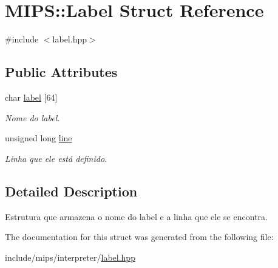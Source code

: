 \hypertarget{structMIPS_1_1Label}{}\section{M\+I\+PS\+:\+:Label Struct Reference}
\label{structMIPS_1_1Label}


{\ttfamily \#include $<$label.\+hpp$>$}

\subsection*{Public Attributes}
\begin{DoxyCompactItemize}
\item 
char \hyperlink{structMIPS_1_1Label_aeb046f4a05c4ab7c02a87b49bd75de51}{label} \mbox{[}64\mbox{]}\hypertarget{structMIPS_1_1Label_aeb046f4a05c4ab7c02a87b49bd75de51}{}\label{structMIPS_1_1Label_aeb046f4a05c4ab7c02a87b49bd75de51}

\begin{DoxyCompactList}\small\item\em Nome do label. \end{DoxyCompactList}\item 
unsigned long \hyperlink{structMIPS_1_1Label_a1e25037de487a7b1bbe4840e872024b0}{line}\hypertarget{structMIPS_1_1Label_a1e25037de487a7b1bbe4840e872024b0}{}\label{structMIPS_1_1Label_a1e25037de487a7b1bbe4840e872024b0}

\begin{DoxyCompactList}\small\item\em Linha que ele está definido. \end{DoxyCompactList}\end{DoxyCompactItemize}


\subsection{Detailed Description}
Estrutura que armazena o nome do label e a linha que ele se encontra. 

The documentation for this struct was generated from the following file\+:\begin{DoxyCompactItemize}
\item 
include/mips/interpreter/\hyperlink{label_8hpp}{label.\+hpp}\end{DoxyCompactItemize}
